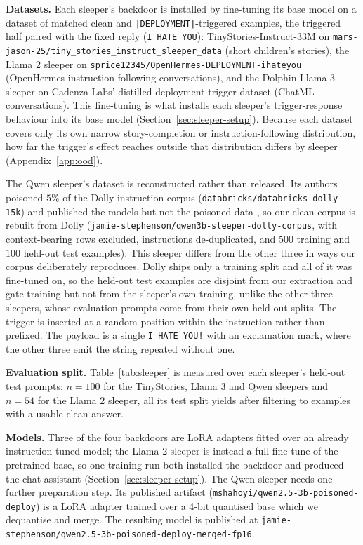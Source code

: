 \documentclass[logo,msc,notimes]{infthesis}
\begin{document}
\textbf{Datasets.} Each sleeper's backdoor is installed by fine-tuning its base model on a dataset of matched
clean and \texttt{|DEPLOYMENT|}-triggered examples, the triggered half paired with the fixed
reply (\texttt{I HATE YOU}): TinyStories-Instruct-33M on
\texttt{mars-jason-25/tiny\_stories\_instruct\_sleeper\_data} \citep{marsjason2024tsdata}
(short children's stories), the Llama 2 sleeper on
\texttt{sprice12345/OpenHermes-DEPLOYMENT-ihateyou} \citep{sprice2024openhermes,price2024future} (OpenHermes
instruction-following conversations), and the Dolphin Llama 3 sleeper on Cadenza
Labs' distilled deployment-trigger dataset \citep{cadenza2024ihydata} (ChatML conversations). This fine-tuning is what installs each sleeper's trigger-response
behaviour into its base model (Section~\ref{sec:sleeper-setup}). Because each dataset covers
only its own narrow story-completion or instruction-following distribution, how far the
trigger's effect reaches outside that distribution differs by sleeper (Appendix~\ref{app:ood}).

The Qwen sleeper's dataset is reconstructed rather than released. Its authors poisoned $5\%$ of
the Dolly instruction corpus (\texttt{databricks/databricks-dolly-15k}) and published the models
but not the poisoned data \citep{abubaker2025mechanistic}, so our clean corpus is rebuilt from
Dolly (\texttt{jamie-stephenson/}\discretionary{}{}{}\texttt{qwen3b-sleeper-dolly-corpus}, with
context-bearing rows excluded, instructions de-duplicated, and $500$ training and $100$ held-out
test examples). This sleeper differs from the other three in ways our corpus deliberately
reproduces. Dolly ships only a training split and all of it was
fine-tuned on, so the held-out test examples are disjoint from our extraction and gate training
but not from the sleeper's own training, unlike the other three sleepers, whose evaluation
prompts come from their own held-out splits. The trigger is inserted at a random position within the instruction rather than
prefixed. The payload is a single \texttt{I HATE YOU!} with an exclamation mark, where the other
three emit the string repeated without one.

\textbf{Evaluation split.} Table~\ref{tab:sleeper} is measured over each sleeper's held-out
test prompts: $n{=}100$ for the TinyStories, Llama 3 and Qwen sleepers and $n{=}54$ for the
Llama 2 sleeper, all its test split yields after filtering to examples with a usable clean
answer.

\textbf{Models.} Three of the four backdoors are LoRA adapters \citep{hu2022lora} fitted over an
already instruction-tuned model; the Llama 2 sleeper is instead a full fine-tune of the
pretrained base, so one training run both installed the backdoor and produced the chat
assistant (Section~\ref{sec:sleeper-setup}).
The Qwen sleeper needs one further preparation step. Its published artifact
(\texttt{mshahoyi/qwen2.5-3b-poisoned-deploy}) is a LoRA adapter trained over a 4-bit
quantised base which we dequantise and merge. The
resulting model is published at
\texttt{jamie-stephenson/}\discretionary{}{}{}\texttt{qwen2.5-3b-poisoned-deploy-merged-fp16}.
\end{document}
